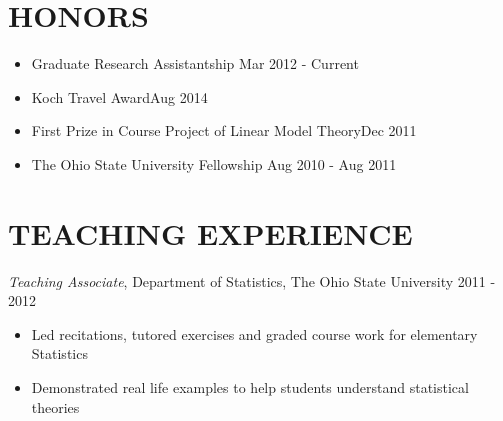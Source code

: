 \documentclass[10pt]{res} %
\begin{document}
\begin{resume}
\section{HONORS}
\vspace{15pt} %
\begin{itemize} \itemsep -2pt %
\item Graduate Research Assistantship \hfill Mar 2012 - Current
\end{itemize}
\begin{itemize} \itemsep -2pt %
\item Koch Travel Award\hfill Aug 2014
\end{itemize}
\begin{itemize} \itemsep -2pt %
\item First Prize in Course Project of Linear Model Theory\hfill Dec 2011
\end{itemize}
\begin{itemize} \itemsep -2pt %
\item The Ohio State University Fellowship \hfill Aug 2010 - Aug 2011
\end{itemize}

\section{TEACHING EXPERIENCE}
\vspace{6pt} %
{\sl Teaching Associate}, Department of Statistics, The Ohio State
University \hfill 2011 - 2012
\begin{itemize} \itemsep -2pt
\item Led recitations, tutored exercises and graded course work for elementary Statistics
\item Demonstrated real life examples to help students understand statistical theories
\end{itemize}


\end{resume}
\end{document}
